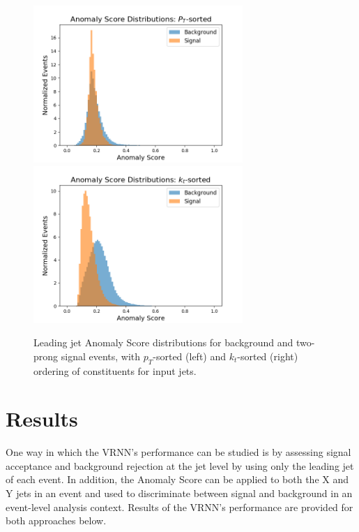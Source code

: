 \documentclass[12pt, a4paper]{article}
\begin{document}
\begin{figure}[H]
	\begin{center}
		\includegraphics[width=225pt]{imgs/Anom_Score_CompPt_SaveForPaper.png}
		\includegraphics[width=225pt]{imgs/bugfix/Anom_Score_CompKt_Rev_Lead_SaveForPaper.png}
	\end{center}
	\caption{Leading jet Anomaly Score distributions for background and two-prong signal events, with $p_T$-sorted (left) and $k_{t}$-sorted (right) ordering of constituents for input jets.}
	\label{fig:score_comp}
\end{figure}





\section{Results}

One way in which the VRNN's performance can be studied is by assessing signal acceptance and background rejection at the jet level by using only the leading jet of each event. In addition, the Anomaly Score can be applied to both the X and Y jets in an event and used to discriminate between signal and background in an event-level analysis context. Results of the VRNN's performance are provided for both approaches below.
\end{document}
